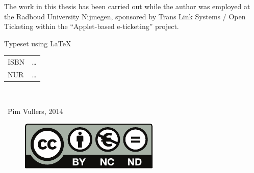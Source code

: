 \thispagestyle{empty}

\noindent
The work in this thesis has been carried out while the author was employed at
the Radboud University Nijmegen, sponsored by Trans Link Systems / Open
Ticketing within the ``Applet-based e-ticketing'' project.

\vspace{142mm}

\noindent Typeset using \LaTeX \\\null

\noindent
\begin{tabular}{ll}
  ISBN & \dots \\
  NUR  & \dots \\
\end{tabular} \\\null

\noindent
\textcopyright\ Pim Vullers, 2014 \\\null

\begin{figure}
  \vspace{-4mm}
  \includegraphics[scale=.94]{images/license}
\end{figure}


